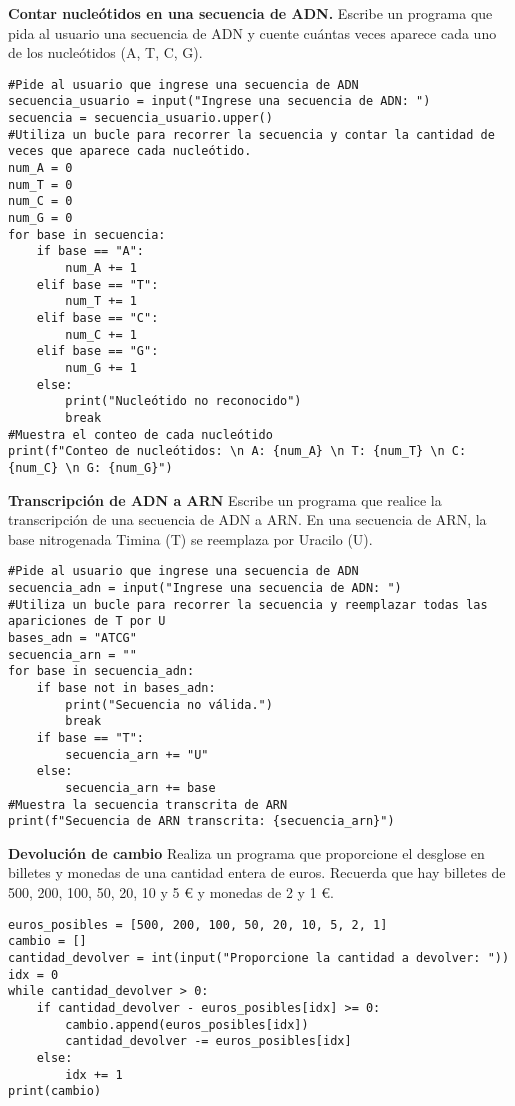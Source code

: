 \documentclass{config/ejercicios}
\begin{document}
\begin{problemS} \textbf{Contar nucleótidos en una secuencia de ADN.}
Escribe un programa que pida al usuario una secuencia de ADN y cuente cuántas veces aparece cada uno de los nucleótidos (A, T, C, G).
\begin{lstlisting}
#Pide al usuario que ingrese una secuencia de ADN
secuencia_usuario = input("Ingrese una secuencia de ADN: ")
secuencia = secuencia_usuario.upper()
#Utiliza un bucle para recorrer la secuencia y contar la cantidad de veces que aparece cada nucleótido.
num_A = 0
num_T = 0
num_C = 0
num_G = 0
for base in secuencia:
	if base == "A":
		num_A += 1
	elif base == "T":
		num_T += 1
	elif base == "C":
		num_C += 1
	elif base == "G":
		num_G += 1
	else:
		print("Nucleótido no reconocido")
		break
#Muestra el conteo de cada nucleótido
print(f"Conteo de nucleótidos: \n A: {num_A} \n T: {num_T} \n C: {num_C} \n G: {num_G}")
\end{lstlisting}
\end{problemS}

\begin{problemS} \textbf{Transcripción de ADN a ARN}
Escribe un programa que realice la transcripción de una secuencia de ADN a ARN. En una secuencia de ARN, la base nitrogenada Timina (T) se reemplaza por Uracilo (U).
\begin{lstlisting}
#Pide al usuario que ingrese una secuencia de ADN
secuencia_adn = input("Ingrese una secuencia de ADN: ")
#Utiliza un bucle para recorrer la secuencia y reemplazar todas las apariciones de T por U
bases_adn = "ATCG"
secuencia_arn = ""
for base in secuencia_adn:
	if base not in bases_adn:
		print("Secuencia no válida.")
		break
	if base == "T":
		secuencia_arn += "U"
	else:
		secuencia_arn += base
#Muestra la secuencia transcrita de ARN
print(f"Secuencia de ARN transcrita: {secuencia_arn}")
\end{lstlisting}
\end{problemS}

\begin{problemS} \textbf{Devolución de cambio}
Realiza un programa que proporcione el desglose en billetes y monedas de una cantidad entera de euros. Recuerda que hay billetes de 500, 200, 100, 50, 20, 10 y 5 € y monedas de 2 y 1 €.
\begin{lstlisting}
euros_posibles = [500, 200, 100, 50, 20, 10, 5, 2, 1]
cambio = []
cantidad_devolver = int(input("Proporcione la cantidad a devolver: "))
idx = 0 
while cantidad_devolver > 0:
	if cantidad_devolver - euros_posibles[idx] >= 0:
		cambio.append(euros_posibles[idx])
		cantidad_devolver -= euros_posibles[idx]
	else:
		idx += 1
print(cambio)
\end{lstlisting}
\end{problemS}
\end{document}
